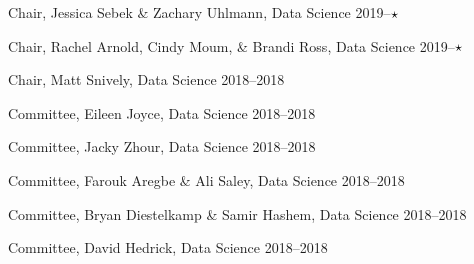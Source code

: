\begin{innerlist}
      \item Chair, Jessica Sebek \& Zachary Uhlmann, Data Science               \hfill 2019--$\star\hspace{1.5em}$
      \item Chair, Rachel Arnold, Cindy Moum, \& Brandi Ross, Data Science      \hfill 2019--$\star\hspace{1.5em}$
      \item Chair, Matt Snively, Data Science                                   \hfill 2018--2018
      \item Committee, Eileen Joyce, Data Science                               \hfill 2018--2018
      \item Committee, Jacky Zhour, Data Science                                \hfill 2018--2018
      \item Committee, Farouk Aregbe \& Ali Saley, Data Science                 \hfill 2018--2018
      \item Committee, Bryan Diestelkamp \& Samir Hashem, Data Science          \hfill 2018--2018
      \item Committee, David Hedrick, Data Science                              \hfill 2018--2018
    \end{innerlist}\vspace{-.1in}
